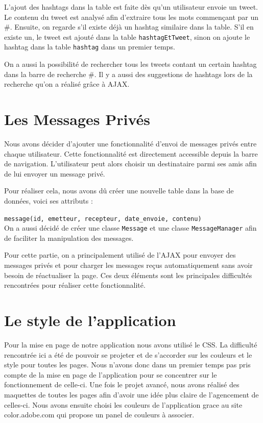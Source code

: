 \documentclass[a4paper, 12pt]{article}
\begin{document}
L'ajout des hashtags dans la table est faite dès qu'un utilisateur envoie un tweet. Le contenu du tweet est analysé afin d'extraire tous les mots commençant par un \#. Ensuite, on regarde s'il existe déjà un hashtag similaire dans la table. S'il en existe un, le tweet est ajouté dans la table \texttt{hashtagEtTweet}, sinon on ajoute le hashtag dans la table \texttt{hashtag} dans un premier temps.
\vspace{1\baselineskip}

On a aussi la possibilité de rechercher tous les tweets contant un certain hashtag dans la barre de recherche \#. Il y a aussi des suggestions de hashtags lors de la recherche qu'on a réalisé grâce à AJAX.

\section{Les Messages Privés}	
Nous avons décider d'ajouter une fonctionnalité d'envoi de messages privés entre chaque utilisateur. 
Cette fonctionnalité est directement accessible depuis la barre de navigation. L'utilisateur peut alors choisir un destinataire parmi ses amis afin de lui envoyer un message privé.

Pour réaliser cela, nous avons dû créer une nouvelle table dans la base de données, voici ses attributs :

 \texttt{message(id, emetteur, recepteur, date\_envoie, contenu)}\\		
On a aussi décidé de créer une classe \texttt{Message} et une classe \texttt{MessageManager} afin de faciliter la manipulation des messages. 

\vspace{2\baselineskip}

Pour cette partie, on a principalement utilisé de l'AJAX pour envoyer des messages privés et pour charger les messages reçus automatiquement sans avoir besoin de réactualiser la page. Ces deux éléments sont les principales difficultés rencontrées pour réaliser cette fonctionnalité.



\section{Le style de l'application}
Pour la mise en page de notre application nous avons utilisé le CSS. La difficulté rencontrée ici a été de pouvoir se projeter et de s'accorder sur les couleurs et le style pour toutes les pages. Nous n'avons donc dans un premier temps pas pris compte de la mise en page de l'application pour se concentrer sur le fonctionnement de celle-ci.
Une fois le projet avancé, nous avons réalisé des maquettes de toutes les pages afin d'avoir une idée plus claire de l'agencement de celles-ci. Nous avons ensuite choisi les couleurs de l'application grace au site color.adobe.com qui propose un panel de couleurs à associer.
\end{document}
